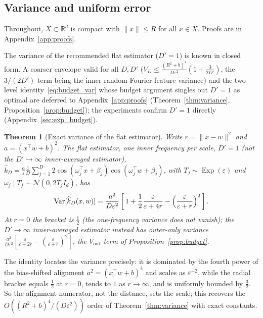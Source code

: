 \documentclass{article}
\newtheorem{theorem}{Theorem}[section]
\DeclareMathOperator{\Var}{Var}
\DeclareMathOperator{\Exp}{Exp}
\begin{document}
\subsection{Variance and uniform error}

Throughout, $X\subset\mathbb{R}^d$ is compact with $\|x\|\le R$ for all $x\in X$. Proofs are in Appendix~\ref{app:proofs}.

The variance of the recommended flat estimator ($D'=1$) is known in closed form. A coarser envelope valid for all $D,D'$ ($V_D\le\frac{(R^2+b)^4}{D\varepsilon^2}(1+\frac{3}{2D'})$, the $3/(2D')$ term being the inner random-Fourier-feature variance) and the two-level identity~\eqref{eq:budget_var} whose budget argument singles out $D'=1$ as optimal are deferred to Appendix~\ref{app:proofs} (Theorem~\ref{thm:variance}, Proposition~\ref{prop:budget}); the experiments confirm $D'=1$ directly (Appendix~\ref{sec:exp_budget}).

\begin{theorem}[Exact variance of the flat estimator]\label{thm:exact_variance}
Write $r=\|x-w\|^2$ and $a=(x^\top w+b)^2$. The flat estimator, \emph{one} inner frequency per scale, $D'=1$ (not the $D'\to\infty$ inner-averaged estimator), $\widehat{k}_D=\tfrac{a}{\varepsilon}\tfrac1D\sum_{j=1}^D 2\cos(\omega_j^\top x+\beta_j)\cos(\omega_j^\top w+\beta_j)$, with $T_j\sim\Exp(\varepsilon)$ and $\omega_j\mid T_j\sim\mathcal{N}(0,2T_jI_d)$, has
\[
\Var[\widehat{k}_D(x,w)]=\frac{a^2}{D\varepsilon^2}\left[\,1+\frac12\frac{\varepsilon}{\varepsilon+4r}-\Bigl(\frac{\varepsilon}{\varepsilon+r}\Bigr)^2\,\right].
\]
At $r=0$ the bracket is $\tfrac12$ (the one-frequency variance does not vanish); the $D'\to\infty$ inner-averaged estimator instead has outer-only variance $\tfrac{a^2}{D\varepsilon^2}[\tfrac{\varepsilon}{\varepsilon+2r}-(\tfrac{\varepsilon}{\varepsilon+r})^2]$, the $V_{\mathrm{out}}$ term of Proposition~\ref{prop:budget}.
\end{theorem}
\noindent The identity locates the variance precisely: it is dominated by the fourth power of the bias-shifted alignment $a^2=(x^\top w+b)^4$ and scales as $\varepsilon^{-2}$, while the radial bracket equals $\tfrac12$ at $r=0$, tends to $1$ as $r\to\infty$, and is uniformly bounded by $\tfrac32$. So the alignment numerator, not the distance, sets the scale; this recovers the $O((R^2+b)^4/(D\varepsilon^2))$ order of Theorem~\ref{thm:variance} with exact constants.
\end{document}
